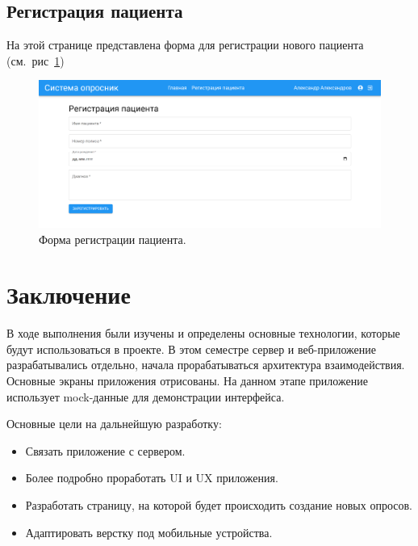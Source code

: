 \documentclass[a4paper,12pt]{article}
\begin{document}
    \newpage
    \subsection{Регистрация пациента}\label{subsec:-3}
    На этой странице представлена форма для регистрации нового пациента (см.\ рис~\ref{fig:figure7})
    \begin{figure}[ht]
        \includegraphics[scale=0.17]{images/screenshots/registration}
        \caption{Форма регистрации пациента.}\label{fig:figure7}
    \end{figure}

    \newpage
    \section*{Заключение}
    \label{sec:3}
    В ходе выполнения были изучены и определены основные технологии, которые будут использоваться в проекте.
    В этом семестре сервер и веб-приложение разрабатывались отдельно, начала прорабатываться архитектура взаимодействия.
    Основные экраны приложения отрисованы.
    На данном этапе приложение использует mock-данные для демонстрации интерфейса.

    Основные цели на дальнейшую разработку:

    \begin{itemize}
        \item Связать приложение с сервером.

        \item Более подробно проработать UI и UX приложения.

        \item Разработать страницу, на которой будет происходить создание новых опросов.

        \item Адаптировать верстку под мобильные устройства.

    \end{itemize}
\end{document}
